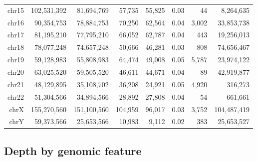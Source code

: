 \documentclass{article}
\begin{document}
\begin{center}
{\begin{longtable}{|r|r|r|r|r|r|r|r|}
  chr15 & 102,531,392 &  81,694,769 &  57,735 &  55,825 & 0.03 &    44 &   8,264,635 \\ 
   \rowcolor[gray]{0.9}chr16 &  90,354,753 &  78,884,753 &  70,250 &  62,564 & 0.04 & 3,002 &  33,853,738 \\ 
  chr17 &  81,195,210 &  77,795,210 &  66,052 &  62,787 & 0.04 &   443 &  19,256,013 \\ 
   \rowcolor[gray]{0.9}chr18 &  78,077,248 &  74,657,248 &  50,666 &  46,281 & 0.03 &   808 &  74,656,467 \\ 
  chr19 &  59,128,983 &  55,808,983 &  64,474 &  49,008 & 0.05 & 5,787 &  23,974,122 \\ 
   \rowcolor[gray]{0.9}chr20 &  63,025,520 &  59,505,520 &  46,611 &  44,671 & 0.04 &    89 &  42,919,877 \\ 
  chr21 &  48,129,895 &  35,108,702 &  36,208 &  24,921 & 0.05 & 4,920 &     316,273 \\ 
   \rowcolor[gray]{0.9}chr22 &  51,304,566 &  34,894,566 &  28,892 &  27,808 & 0.04 &    54 &     661,661 \\ 
  chrX & 155,270,560 & 151,100,560 & 104,959 &  96,017 & 0.03 & 3,752 & 104,487,419 \\ 
   \rowcolor[gray]{0.9}chrY &  59,373,566 &  25,653,566 &  10,983 &   9,112 & 0.02 &   383 &  25,653,527 \\ 
   \hline
\hline
\end{longtable}
}\end{center}

\subsection{Depth by genomic feature}
\end{document}
